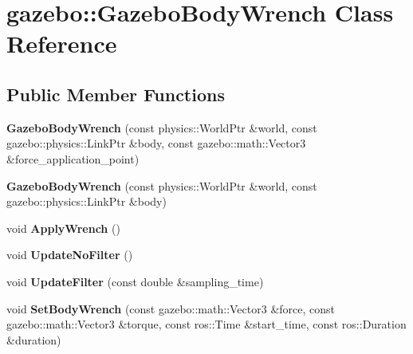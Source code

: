 \hypertarget{classgazebo_1_1_gazebo_body_wrench}{\section{gazebo\-:\-:Gazebo\-Body\-Wrench Class Reference}
\label{classgazebo_1_1_gazebo_body_wrench}
}
\subsection*{Public Member Functions}
\begin{DoxyCompactItemize}
\item 
\hypertarget{classgazebo_1_1_gazebo_body_wrench_a984289511dfcf80edc860b523a809953}{{\bfseries Gazebo\-Body\-Wrench} (const physics\-::\-World\-Ptr \&world, const gazebo\-::physics\-::\-Link\-Ptr \&body, const gazebo\-::math\-::\-Vector3 \&force\-\_\-application\-\_\-point)}\label{classgazebo_1_1_gazebo_body_wrench_a984289511dfcf80edc860b523a809953}

\item 
\hypertarget{classgazebo_1_1_gazebo_body_wrench_af17d57ca04935917517831f3f502997a}{{\bfseries Gazebo\-Body\-Wrench} (const physics\-::\-World\-Ptr \&world, const gazebo\-::physics\-::\-Link\-Ptr \&body)}\label{classgazebo_1_1_gazebo_body_wrench_af17d57ca04935917517831f3f502997a}

\item 
\hypertarget{classgazebo_1_1_gazebo_body_wrench_a266741da47bedeedb15b7bc43ef53188}{void {\bfseries Apply\-Wrench} ()}\label{classgazebo_1_1_gazebo_body_wrench_a266741da47bedeedb15b7bc43ef53188}

\item 
\hypertarget{classgazebo_1_1_gazebo_body_wrench_aa25dd4548ae87b8b3d23ea922d8a0f9e}{void {\bfseries Update\-No\-Filter} ()}\label{classgazebo_1_1_gazebo_body_wrench_aa25dd4548ae87b8b3d23ea922d8a0f9e}

\item 
\hypertarget{classgazebo_1_1_gazebo_body_wrench_a9c35669b56e1d9640cddc1fccf93bd7f}{void {\bfseries Update\-Filter} (const double \&sampling\-\_\-time)}\label{classgazebo_1_1_gazebo_body_wrench_a9c35669b56e1d9640cddc1fccf93bd7f}

\item 
\hypertarget{classgazebo_1_1_gazebo_body_wrench_a8ba355bad85027cd7cc1c15131d8e792}{void {\bfseries Set\-Body\-Wrench} (const gazebo\-::math\-::\-Vector3 \&force, const gazebo\-::math\-::\-Vector3 \&torque, const ros\-::\-Time \&start\-\_\-time, const ros\-::\-Duration \&duration)}\label{classgazebo_1_1_gazebo_body_wrench_a8ba355bad85027cd7cc1c15131d8e792}


\end{DoxyCompactItemize}
